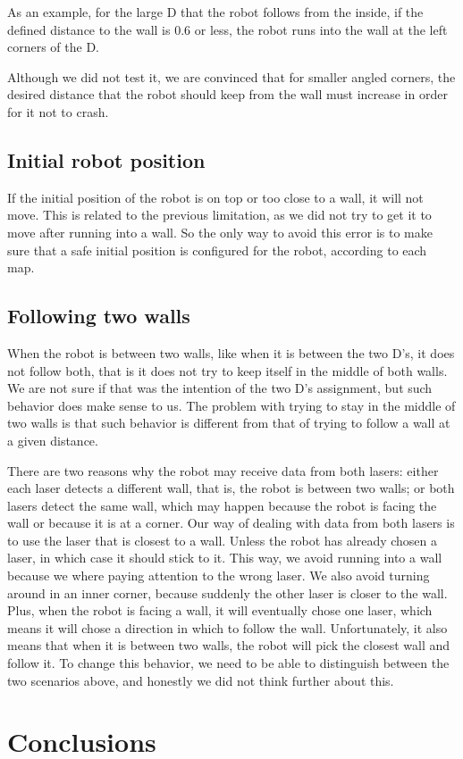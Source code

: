\documentclass[12pt,a4paper,reqno]{article}
\numberwithin{figure}{section}
\numberwithin{equation}{section}
\begin{document}
As an example, for the large D that the robot follows from the inside, if the defined distance to the wall is 0.6 or less, the robot runs into the wall at the left corners of the D.

Although we did not test it, we are convinced that for smaller angled corners, the desired distance that the robot should keep from the wall must increase in order for it not to crash.

\subsection{Initial robot position}

If the initial position of the robot is on top or too close to a wall, it will not move. This is related to the previous limitation, as we did not try to get it to move after running into a wall. So the only way to avoid this error is to make sure that a safe initial position is configured for the robot, according to each map.

\subsection{Following two walls}

When the robot is between two walls, like when it is between the two D's, it does not follow both, that is it does not try to keep itself in the middle of both walls. We are not sure if that was the intention of the two D's assignment, but such behavior does make sense to us. The problem with trying to stay in the middle of two walls is that such behavior is different from that of trying to follow a wall at a given distance. 

There are two reasons why the robot may receive data from both lasers: either each laser detects a different wall, that is, the robot is between two walls; or both lasers detect the same wall, which may happen because the robot is facing the wall or because it is at a corner. Our way of dealing with data from both lasers is to use the laser that is closest to a wall. Unless the robot has already chosen a laser, in which case it should stick to it. This way, we avoid running into a wall because we where paying attention to the wrong laser. We also avoid turning around in an inner corner, because suddenly the other laser is closer to the wall. Plus, when the robot is facing a wall, it will eventually chose one laser, which means it will chose a direction in which to follow the wall. Unfortunately, it also means that when it is between two walls, the robot will pick the closest wall and follow it. To change this behavior, we need to be able to distinguish between the two scenarios above, and honestly we did not think further about this.

\section{Conclusions}



\end{document}
